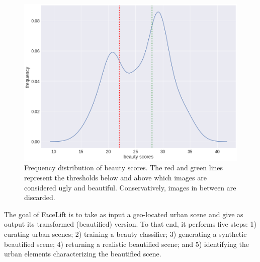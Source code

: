 
\begin{figure}[t!]
	\centering
	\includegraphics[width=0.7\columnwidth]{Plot/Trueskill.png}
	\caption{Frequency distribution of beauty scores. The red and green lines represent the thresholds below and above which images are considered ugly and beautiful. Conservatively, images in between are discarded.}
	\label{fig:Trueskill}
\end{figure}

The goal of FaceLift is to take as input a geo-located urban scene and give as output its transformed (beautified) version. 
To that end, it performs five steps: 1) curating urban scenes; 2) training a beauty classifier; 3) generating a synthetic beautified scene; 4) returning a realistic beautified scene; and 5) identifying the urban elements characterizing the beautified scene. 
 
 
 
